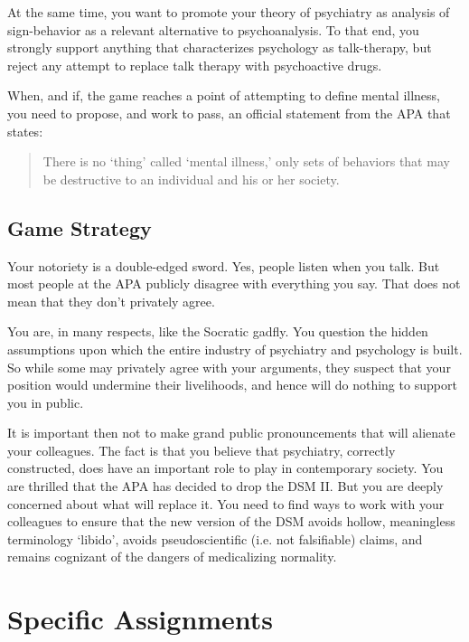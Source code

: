 \begin{refsection}
At the same time, you want to promote your theory of psychiatry as analysis of sign-behavior as a relevant alternative to psychoanalysis. To that end, you strongly support anything that characterizes psychology as talk-therapy, but reject any attempt to replace talk therapy with psychoactive drugs.

When, and if, the game reaches a point of attempting to define mental illness, you need to propose, and work to pass, an official statement from the APA that states:

\begin{quote}

There is no `thing' called `mental illness,' only sets of behaviors that may be destructive to an individual and his or her society.
\end{quote}

\subsection{Game Strategy}
\label{gamestrategy}

Your notoriety is a double-edged sword. Yes, people listen when you talk. But most people at the APA publicly disagree with everything you say. That does not mean that they don't privately agree.

You are, in many respects, like the Socratic gadfly. You question the hidden assumptions upon which the entire industry of psychiatry and psychology is built. So while some may privately agree with your arguments, they suspect that your position would undermine their livelihoods, and hence will do nothing to support you in public.

It is important then not to make grand public pronouncements that will alienate your colleagues. The fact is that you believe that psychiatry, correctly constructed, does have an important role to play in contemporary society. You are thrilled that the APA has decided to drop the DSM II. But you are deeply concerned about what will replace it. You need to find ways to work with your colleagues to ensure that the new version of the DSM avoids hollow, meaningless terminology ‘libido’, avoids pseudoscientific (i.e. not falsifiable) claims, and remains cognizant of the dangers of medicalizing normality.

\section{Specific Assignments}
\label{specificassignments}


\end{refsection}
